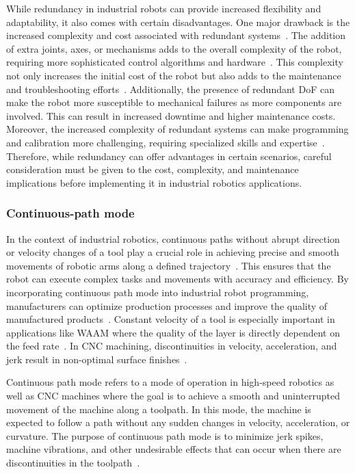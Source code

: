 While redundancy in industrial robots can provide increased flexibility and adaptability, it also comes with certain disadvantages. One major drawback is the increased complexity and cost associated with redundant systems~\cite{Halevi.2011}. The addition of extra joints, axes, or mechanisms adds to the overall complexity of the robot, requiring more sophisticated control algorithms and hardware~\cite{Duong.2021}. This complexity not only increases the initial cost of the robot but also adds to the maintenance and troubleshooting efforts~\cite{Ahangar.2019}. Additionally, the presence of redundant \acrshort{DoF} can make the robot more susceptible to mechanical failures as more components are involved. This can result in increased downtime and higher maintenance costs. Moreover, the increased complexity of redundant systems can make programming and calibration more challenging, requiring specialized skills and expertise~\cite{Erdos.2016}. Therefore, while redundancy can offer advantages in certain scenarios, careful consideration must be given to the cost, complexity, and maintenance implications before implementing it in industrial robotics applications.




\subsubsection{Continuous-path mode}\label{CPM}
In the context of industrial robotics, continuous paths without abrupt direction or velocity changes of a tool play a crucial role in achieving precise and smooth movements of robotic arms along a defined trajectory~\cite{Jia.2018}. This ensures that the robot can execute complex tasks and movements with accuracy and efficiency. By incorporating continuous path mode into industrial robot programming, manufacturers can optimize production processes and improve the quality of manufactured products~\cite{Zhang.2020}. Constant velocity of a tool is especially important in applications like \acrshort{WAAM} where the quality of the layer is directly dependent on the feed rate~\cite{Li.2018b}. In \acrshort{CNC} machining, discontinuities in velocity, acceleration, and jerk result in non-optimal surface finishes~\cite{Sun.2021}.


Continuous path mode refers to a mode of operation in high-speed robotics as well as \acrshort{CNC} machines where the goal is to achieve a smooth and uninterrupted movement of the machine along a toolpath. In this mode, the machine is expected to follow a path without any sudden changes in velocity, acceleration, or curvature. The purpose of continuous path mode is to minimize jerk spikes, machine vibrations, and other undesirable effects that can occur when there are discontinuities in the toolpath~\cite{Jia.2018, Yang.2017}.

